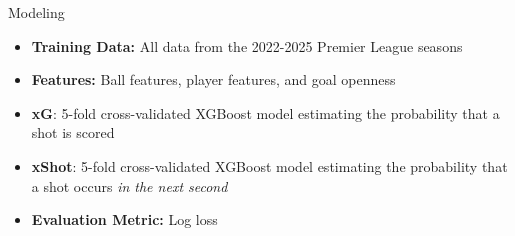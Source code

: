 \documentclass{beamer}
\begin{document}
\begin{frame}{Modeling}
\begin{itemize}
  \item \textbf{Training Data:} All data from the 2022-2025 Premier League seasons
  \item \textbf{Features:} Ball features, player features, and goal openness
  \item \textbf{xG}: 5-fold cross-validated XGBoost model estimating the probability that a shot is scored
  \item \textbf{xShot}: 5-fold cross-validated XGBoost model estimating the probability that a shot occurs \emph{in the next second}

  \item \textbf{Evaluation Metric:} Log loss
\end{itemize}
\end{frame}
\end{document}
